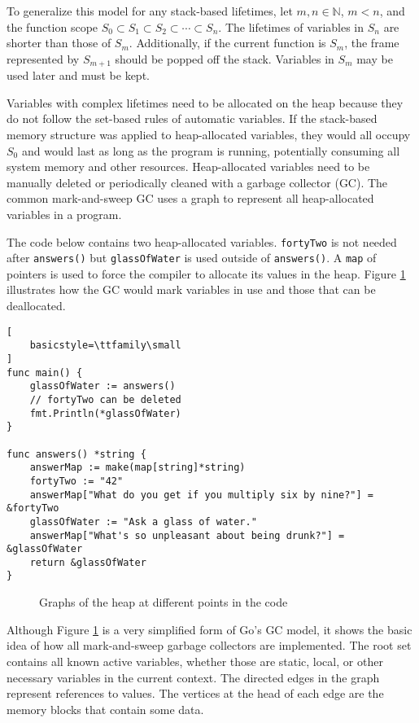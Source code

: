 \documentclass[11pt, letterpaper]{report}
\begin{document}
To generalize this model for any stack-based lifetimes, let $m, n \in \mathbb{N}$, $m < n$, and the function scope $S_0 \subset S_1 \subset S_2 \subset \cdots \subset S_n$. The lifetimes of variables in $S_n$ are shorter than those of $S_m$. Additionally, if the current function is $S_m$, the frame represented by $S_{m+1}$ should be popped off the stack. Variables in $S_m$ may be used later and must be kept.

Variables with complex lifetimes need to be allocated on the heap because they do not follow the set-based rules of automatic variables. If the stack-based memory structure was applied to heap-allocated variables, they would all occupy $S_0$ and would last as long as the program is running, potentially consuming all system memory and other resources. Heap-allocated variables need to be manually deleted or periodically cleaned with a garbage collector (GC). The common mark-and-sweep GC uses a graph to represent all heap-allocated variables in a program. \cite{geeksforgeeks.org}

The code below contains two heap-allocated variables. \lstinline{fortyTwo} is not needed after \lstinline{answers()} but \lstinline{glassOfWater} is used outside of \lstinline{answers()}. A \lstinline{map} of pointers is used to force the compiler to allocate its values in the heap. Figure \ref{heap_graph} illustrates how the GC would mark variables in use and those that can be deallocated.

\begin{lstlisting}[
    basicstyle=\ttfamily\small
]
func main() {
	glassOfWater := answers()
	// fortyTwo can be deleted
	fmt.Println(*glassOfWater)
}

func answers() *string {
	answerMap := make(map[string]*string)
	fortyTwo := "42"
	answerMap["What do you get if you multiply six by nine?"] = &fortyTwo
	glassOfWater := "Ask a glass of water."
	answerMap["What's so unpleasant about being drunk?"] = &glassOfWater
	return &glassOfWater
}
\end{lstlisting}

\begin{figure}[htb!]
    \centering
    
    \caption{Graphs of the heap at different points in the code}
    \label{heap_graph}
\end{figure}

Although Figure \ref{heap_graph} is a very simplified form of Go's GC model, it shows the basic idea of how all mark-and-sweep garbage collectors are implemented. \cite{golang.org} The root set contains all known active variables, whether those are static, local, or other necessary variables in the current context. \cite{dynatrace.com} The directed edges in the graph represent references to values. The vertices at the head of each edge are the memory blocks that contain some data.
\end{document}
